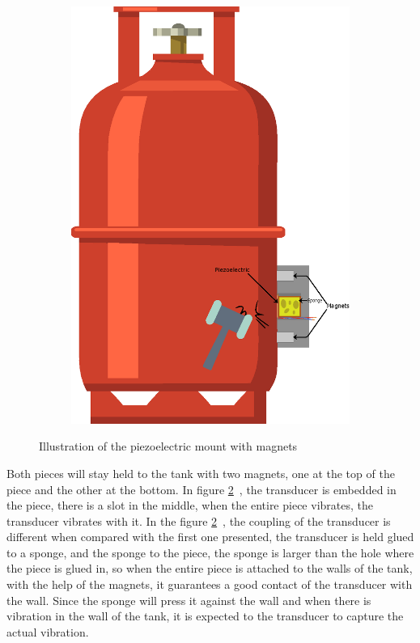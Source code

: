 \begin{figure}[]
\begin{subfigure}{0.3\textwidth}
        \includegraphics[width=\linewidth]{Chapters/4CHP/Figures/PiezoMagnets.eps}
        \caption{}{}
        \label{subfig:piezosponge}
    \end{subfigure}
    \caption{Illustration of the piezoelectric mount with magnets}{}
    \label{fig:coupPiezo}
\end{figure}
Both pieces will stay held to the tank with two magnets, one at the top of the piece and the other at the bottom. In figure \ref{fig:coupPiezo}~, the transducer is embedded in the piece, there is a slot in the middle, when the entire piece vibrates, the transducer vibrates with it. In the figure \ref{fig:coupPiezo}~, the coupling of the transducer is different when compared with the first one presented, the transducer is held glued to a sponge, and the sponge to the piece, the sponge is larger than the hole where the piece is glued in, so when the entire piece is attached to the walls of the tank, with the help of the magnets, it guarantees a good contact of the transducer with the wall. Since the sponge will press it against the wall and when there is vibration in the wall of the tank, it is expected to the transducer to capture the actual vibration. 

